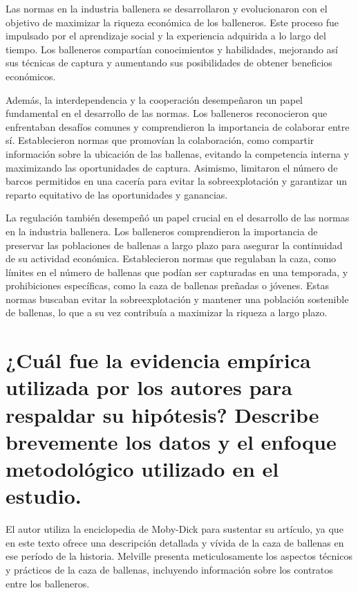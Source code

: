 \documentclass[11pt]{article}
\begin{document}
\begin{flushleft}
    Las normas en la industria ballenera se desarrollaron y evolucionaron con el objetivo de maximizar la riqueza económica de los balleneros. Este proceso fue impulsado por el aprendizaje social y la experiencia adquirida a lo largo del tiempo. Los balleneros compartían conocimientos y habilidades, mejorando así sus técnicas de captura y aumentando sus posibilidades de obtener beneficios económicos.

Además, la interdependencia y la cooperación desempeñaron un papel fundamental en el desarrollo de las normas. Los balleneros reconocieron que enfrentaban desafíos comunes y comprendieron la importancia de colaborar entre sí. Establecieron normas que promovían la colaboración, como compartir información sobre la ubicación de las ballenas, evitando la competencia interna y maximizando las oportunidades de captura. Asimismo, limitaron el número de barcos permitidos en una cacería para evitar la sobreexplotación y garantizar un reparto equitativo de las oportunidades y ganancias.

La regulación también desempeñó un papel crucial en el desarrollo de las normas en la industria ballenera. Los balleneros comprendieron la importancia de preservar las poblaciones de ballenas a largo plazo para asegurar la continuidad de su actividad económica. Establecieron normas que regulaban la caza, como límites en el número de ballenas que podían ser capturadas en una temporada, y prohibiciones específicas, como la caza de ballenas preñadas o jóvenes. Estas normas buscaban evitar la sobreexplotación y mantener una población sostenible de ballenas, lo que a su vez contribuía a maximizar la riqueza a largo plazo.
\end{flushleft}

\section{¿Cuál fue la evidencia empírica utilizada por los autores para respaldar su hipótesis? Describe brevemente los datos y el enfoque metodológico utilizado en el estudio.}

\begin{flushleft}
    El autor utiliza la enciclopedia de Moby-Dick para sustentar su artículo, ya que en este texto ofrece una descripción detallada y vívida de la caza de ballenas en ese período de la historia. Melville presenta meticulosamente los aspectos técnicos y prácticos de la caza de ballenas, incluyendo información sobre los contratos entre los balleneros.
\end{flushleft}
\end{document}
